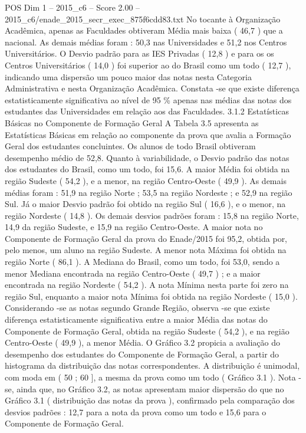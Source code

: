 \begin{textsample}{POS Dim 1 – 2015\_c6 – Score 2.00 – 2015\_c6/enade\_2015\_secr\_exec\_875f6cdd83.txt}
No tocante à Organização Acadêmica, apenas as Faculdades obtiveram Média mais baixa ( 46,7 ) que a nacional.
As demais médias foram : 50,3 nas Universidades e 51,2 nos Centros Universitários.
O Desvio padrão para as IES Privadas ( 12,8 ) e para os os Centros Universitários ( 14,0 ) foi superior ao do Brasil como um todo ( 12,7 ), indicando uma dispersão um pouco maior das notas nesta Categoria Administrativa e nesta Organização Acadêmica.
Constata -se que existe diferença estatisticamente significativa ao nível de 95 \% apenas nas médias das notas dos estudantes das Universidades em relação aos das Faculdades. 3.1.2 Estatísticas Básicas no Componente de Formação Geral A Tabela 3.5 apresenta as Estatísticas Básicas em relação ao componente da prova que avalia a Formação Geral dos estudantes concluintes.
Os alunos de todo Brasil obtiveram desempenho médio de 52,8.
Quanto à variabilidade, o Desvio padrão das notas dos estudantes do Brasil, como um todo, foi 15,6.
A maior Média foi obtida na região Sudeste ( 54,2 ), e a menor, na região Centro-Oeste ( 49,9 ).
As demais médias foram : 51,9 na região Norte ; 53,5 na região Nordeste ; e 52,9 na região Sul.
Já o maior Desvio padrão foi obtido na região Sul ( 16,6 ), e o menor, na região Nordeste ( 14,8 ).
Os demais desvios padrões foram : 15,8 na região Norte, 14,9 da região Sudeste, e 15,9 na região Centro-Oeste.
A maior nota no Componente de Formação Geral da prova do Enade/2015 foi 95,2, obtida por, pelo menos, um aluno na região Sudeste.
A menor nota Máxima foi obtida na região Norte ( 86,1 ).
A Mediana do Brasil, como um todo, foi 53,0, sendo a menor Mediana encontrada na região Centro-Oeste ( 49,7 ) ; e a maior encontrada na região Nordeste ( 54,2 ).
A nota Mínima nesta parte foi zero na região Sul, enquanto a maior nota Mínima foi obtida na região Nordeste ( 15,0 ).
Considerando -se as notas segundo Grande Região, observa -se que existe diferença estatisticamente significativa entre a maior Média das notas do Componente de Formação Geral, obtida na região Sudeste ( 54,2 ), e na região Centro-Oeste ( 49,9 ), a menor Média.
O Gráfico 3.2 propicia a avaliação do desempenho dos estudantes do Componente de Formação Geral, a partir do histograma da distribuição das notas correspondentes.
A distribuição é unimodal, com moda em ( 50 ; 60 ], a mesma da prova como um todo ( Gráfico 3.1 ).
Nota -se, ainda que, no Gráfico 3.2, as notas apresentam maior dispersão do que no Gráfico 3.1 ( distribuição das notas da prova ), confirmado pela comparação dos desvios padrões : 12,7 para a nota da prova como um todo e 15,6 para o Componente de Formação Geral.

\end{textsample}
